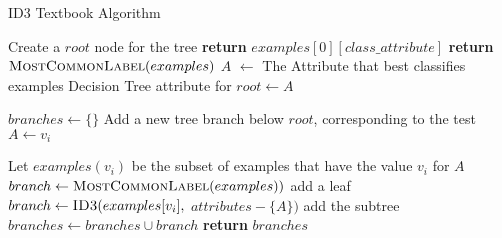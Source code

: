 \begin{algorithm}[H]
\caption{ID3 Textbook Algorithm }\label{a:id3-simple}
\begin{algorithmic}[1]

    \State Create a $root$ node for the tree
        \State \textbf{return} $examples[0][class\_attribute]$
        \State \textbf{return} $\textsc{MostCommonLabel}(examples)$
    \EndIf
    \State $A$ $\gets$ The Attribute that best classifies examples
    \State Decision Tree attribute for $root \gets A$

    \State $branches \gets \{\}$
        \State Add a new tree branch below $root$, corresponding to the test $A \gets v_i$
        
        \State Let $examples(v_i)$ be the subset of examples that have the value $v_i$ for $A$
            \State $branch \gets \textsc{MostCommonLabel}(examples))$ add a leaf
        \Else
            \State $branch \gets \textsc{ID3}(examples[v_i],$ $attributes - \{A\})$ add the subtree
        \EndIf
        \State $branches \gets branches \cup branch$
    \EndFor
    \State \textbf{return} $branches$
\EndProcedure
\end{algorithmic}
\end{algorithm}

